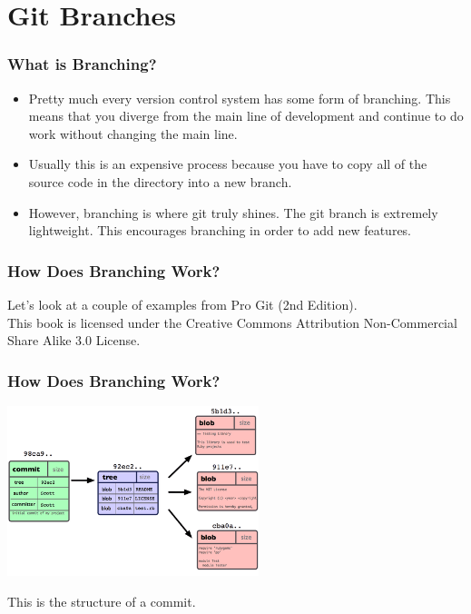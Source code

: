 
\section[Branching]{Git Branches}

\begin{frame}
\frametitle{\large What is Branching?}
\begin{itemize}
\item Pretty much every version control system has some form of branching. This means that you diverge from the main line of development and continue to do work without changing the main line.
\pause
\item Usually this is an expensive process because you have to copy all of the source code in the directory into a new branch.
\pause
\item However, branching is where git truly shines. The git branch is extremely lightweight. This encourages branching in order to add new features.
\end{itemize}
\end{frame}
\note{}

\begin{frame}
\frametitle{\large How Does Branching Work?}
\begin{center}
Let's look at a couple of examples from Pro Git (2nd Edition). \\
This book is licensed under the Creative Commons Attribution Non-Commercial Share Alike 3.0 License.
\end{center}
\end{frame}
\note{}

\begin{frame}
\frametitle{\large How Does Branching Work?}
\begin{center}
\includegraphics[width=0.55\textwidth]{img/branching_images/fig1.png}
\end{center}
\vspace{2mm}
\begin{center}
This is the structure of a commit.
\end{center}
\end{frame}
\note{}

